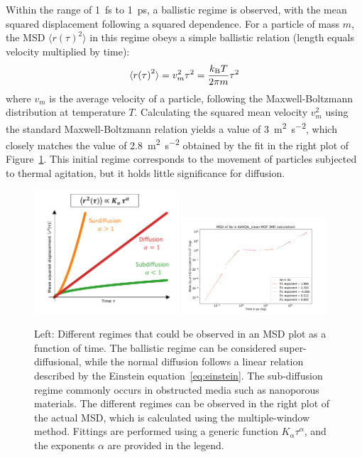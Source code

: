 \documentclass[main]{subfiles}
\begin{document}
Within the range of \SI{1}{\fs} to \SI{1}{\ps}, a ballistic regime is observed, with the mean squared displacement following a squared dependence. For a particle of mass $m$, the MSD $\langle {r(\tau)}^2 \rangle$ in this regime obeys a simple ballistic relation (length equals velocity multiplied by time):
\begin{equation}
  \langle {r(\tau)}^2 \rangle = v_m^2 \tau^2 = \frac{k_{\text{B}}T}{2\pi m}\tau^2
\end{equation}
where $v_m$ is the average velocity of a particle, following the Maxwell-Boltzmann distribution at temperature $T$. Calculating the squared mean velocity $v_m^2$ using the standard Maxwell-Boltzmann relation yields a value of \SI{3}{\square\m\per\square\second}, which closely matches the value of \SI{2.8}{\square\m\per\square\second} obtained by the fit in the right plot of Figure~\ref{fgr:MSD_init}. This initial regime corresponds to the movement of particles subjected to thermal agitation, but it holds little significance for diffusion.

\begin{figure}[ht]
  \centering
    \includegraphics[width=0.48\textwidth]{figures/5-diffusion/MSD_anomalous_diffusion.pdf}
    \includegraphics[width=0.48\textwidth]{figures/5-diffusion/MSD_Xe_KAXQIL_clean.pdf}
    \caption{Left: Different regimes that could be observed in an MSD plot as a function of time. The ballistic regime can be considered super-diffusional, while the normal diffusion follows a linear relation described by the Einstein equation~\ref{eq:einstein}. The sub-diffusion regime commonly occurs in obstructed media such as nanoporous materials. The different regimes can be observed in the right plot of the actual MSD, which is calculated using the multiple-window method. Fittings are performed using a generic function $K_\alpha\tau^\alpha$, and the exponents $\alpha$ are provided in the legend. }\label{fgr:MSD_init}
\end{figure}
\end{document}
